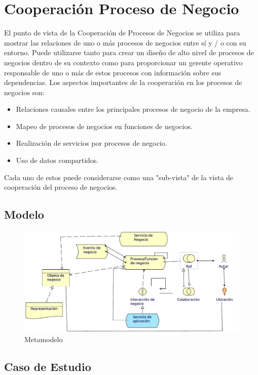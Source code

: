 \section{Cooperación Proceso de Negocio}
El punto de vista de la Cooperación de Procesos de Negocios se utiliza para mostrar las relaciones de uno o más procesos de negocios entre sí y / o con su entorno. Puede utilizarse tanto para crear un diseño de alto nivel de procesos de negocios dentro de su contexto como para proporcionar un gerente operativo responsable de uno o más de estos procesos con información sobre sus dependencias. Los aspectos importantes de la cooperación en los procesos de negocios son:
\begin{itemize}
\item Relaciones causales entre los principales procesos de negocio de la empresa.
\item Mapeo de procesos de negocios en funciones de negocios.
\item Realización de servicios por procesos de negocio.
\item Uso de datos compartidos.
\end{itemize}
Cada uno de estos puede considerarse como una "sub-vista" de la vista de cooperación del proceso de negocios.
\subsection{Modelo}
\begin{figure}[h!]
	\centering
	\includegraphics[width=\linewidth]{Arquitectura/Negocio/imgs/ProcesoNegocioMetamodelo.pdf}
	\caption{Metamodelo}
\end{figure}
\newpage
\subsection{Caso de Estudio}

